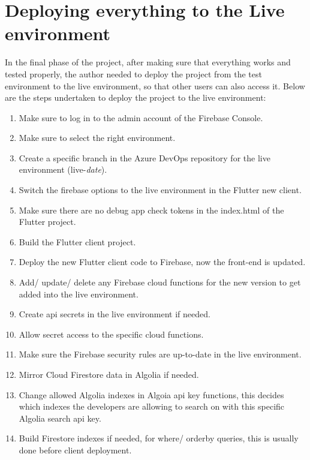 \section{Deploying everything to the Live environment}

In the final phase of the project, after making sure that everything works and tested properly, the author needed to deploy the project
from the test environment to the live environment, so that other users can also access it. Below are the steps undertaken to deploy the
project to the live environment:

\begin{enumerate}
  \item Make sure to log in to the admin account of the Firebase Console.
  \item Make sure to select the right environment.
  \item Create a specific branch in the Azure DevOps repository for the live environment (live-\textit{date}).
  \item Switch the firebase options to the live environment in the Flutter new client.
  \item Make sure there are no debug app check tokens in the index.html of the Flutter project.
  \item Build the Flutter client project.
  \item Deploy the new Flutter client code to Firebase, now the front-end is updated.
  \item Add/ update/ delete any Firebase cloud functions for the new version to get added into the live environment.
  \item Create \acrshort{api} secrets in the live environment if needed.
  \item Allow secret access to the specific cloud functions.
  \item Make sure the Firebase security rules are up-to-date in the live environment.
  \item Mirror Cloud Firestore data in Algolia if needed.
  \item Change allowed Algolia indexes in Algoia \acrshort{api} key functions, this decides which indexes the developers
        are allowing to search on with this specific Algolia search \acrshort{api} key.
  \item Build Firestore indexes if needed, for where/ orderby queries, this is usually done before client deployment.
\end{enumerate}